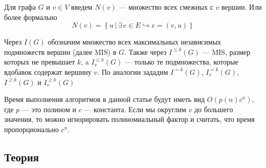 \documentclass[12pt]{article}
\begin{document}
Для графа $G$ и $v \in V$ введем $N\left(v\right)$ --- мно\-же\-ство всех смежных с $v$ вершин. Или более формально 
$$N\left(v\right) = \left\{u \, | \, \exists \, e \in E \hookrightarrow e = \left(v, u\right) \right\}$$

Через $I\left(G\right)$ обозначим множество всех максимальных независимых подмножеств вершин (далее $\text{MIS}$) в $G$. Также через $I^{\leq k}\left(G\right)$ --- $\text{MIS}$, размер которых не превышает $k$, a $I^{\leq k}_{v}\left(G\right)$ --- только те подмножества, которые вдобавок содержат вершину $v$. По аналогии зададим $I^{= k}\left(G\right)$, $I^{= k}_{v}\left(G\right)$, $I^{\geq k}\left(G\right)$ и $I^{\geq k}_{v}\left(G\right)$

Время выполнения алгоритмов в данной статье будут иметь вид $O\left(p\left(n\right) c^n\right)$, где $p$ --- это полином и $c$ --- константа. Если мы округлим $v$ до большего значения, то можно игнорировать полиномиальный фактор и считать, что время пропорционально $c^n$.

\subsection{Теория}
\end{document}
